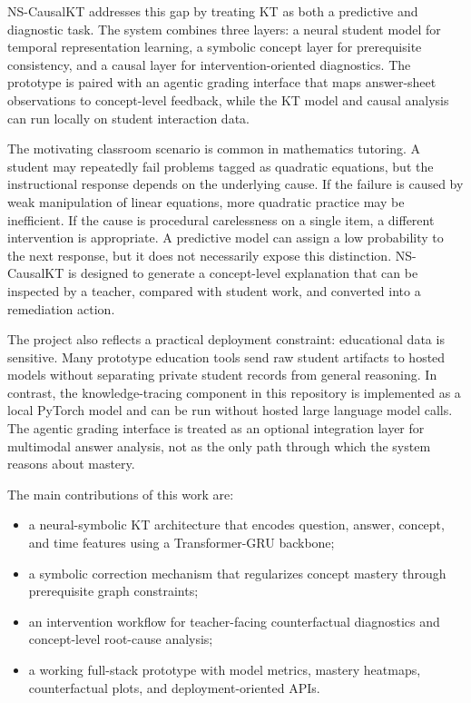 \documentclass[conference]{IEEEtran}
\begin{document}
NS-CausalKT addresses this gap by treating KT as both a predictive and diagnostic task. The system combines three layers: a neural student model for temporal representation learning, a symbolic concept layer for prerequisite consistency, and a causal layer for intervention-oriented diagnostics. The prototype is paired with an agentic grading interface that maps answer-sheet observations to concept-level feedback, while the KT model and causal analysis can run locally on student interaction data.

The motivating classroom scenario is common in mathematics tutoring. A student may repeatedly fail problems tagged as quadratic equations, but the instructional response depends on the underlying cause. If the failure is caused by weak manipulation of linear equations, more quadratic practice may be inefficient. If the cause is procedural carelessness on a single item, a different intervention is appropriate. A predictive model can assign a low probability to the next response, but it does not necessarily expose this distinction. NS-CausalKT is designed to generate a concept-level explanation that can be inspected by a teacher, compared with student work, and converted into a remediation action.

The project also reflects a practical deployment constraint: educational data is sensitive. Many prototype education tools send raw student artifacts to hosted models without separating private student records from general reasoning. In contrast, the knowledge-tracing component in this repository is implemented as a local PyTorch model and can be run without hosted large language model calls. The agentic grading interface is treated as an optional integration layer for multimodal answer analysis, not as the only path through which the system reasons about mastery.

The main contributions of this work are:
\begin{itemize}
    \item a neural-symbolic KT architecture that encodes question, answer, concept, and time features using a Transformer-GRU backbone;
    \item a symbolic correction mechanism that regularizes concept mastery through prerequisite graph constraints;
    \item an intervention workflow for teacher-facing counterfactual diagnostics and concept-level root-cause analysis;
    \item a working full-stack prototype with model metrics, mastery heatmaps, counterfactual plots, and deployment-oriented APIs.
\end{itemize}
\end{document}
